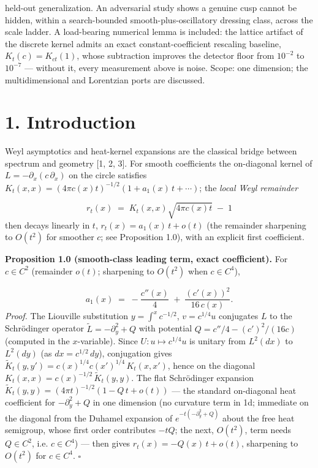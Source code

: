 \documentclass[11pt]{article}
\begin{document}
held-out generalization. An adversarial study shows a genuine cusp cannot be hidden, within a search-bounded smooth-plus-oscillatory dressing class, across the scale ladder.  A load-bearing numerical lemma is included: the lattice artifact of the discrete kernel admits an exact constant-coefficient rescaling baseline, $K_t(c) = K_{ct}(1)$, whose subtraction improves the detector floor from $10^{-2}$ to $10^{-7}$ — without it, every measurement above is noise.  Scope: one dimension; the multidimensional and Lorentzian ports are discussed.

\section*{1. Introduction}
Weyl asymptotics and heat-kernel expansions are the classical bridge between spectrum and geometry [1, 2, 3].  For smooth coefficients the on-diagonal kernel of $L = -\partial_x(c\,\partial_x)$ on the circle satisfies $K_t(x,x) = (4\pi c(x)t)^{-1/2}(1 + a_1(x)\,t + \cdots)$; the \emph{local Weyl remainder}

\[
r_t(x) \;=\; K_t(x,x)\sqrt{4\pi c(x)t} \;-\; 1
\]
then decays linearly in $t$, $r_t(x) = a_1(x)\,t + o(t)$ (the remainder sharpening to $O(t^2)$ for smoother $c$; see Proposition 1.0), with an explicit first coefficient.

\textbf{Proposition 1.0 (smooth-class leading term, exact coefficient).} For $c \in C^2$ (remainder $o(t)$; sharpening to $O(t^2)$ when $c \in C^4$),

\[
a_1(x) \;=\; -\frac{c''(x)}{4} \;+\; \frac{(c'(x))^2}{16\,c(x)} .
\]
\emph{Proof.}  The Liouville substitution $y = \int^x c^{-1/2}$, $v = c^{1/4}u$ conjugates $L$ to the Schrödinger operator $\tilde L = -\partial_y^2 + Q$ with potential $Q = c''/4 - (c')^2/(16c)$ (computed in the $x$-variable).  Since $U : u \mapsto c^{1/4}u$ is unitary from $L^2(dx)$ to $L^2(dy)$ (as $dx = c^{1/2}\,dy$), conjugation gives $\tilde K_t(y,y') = c(x)^{1/4}c(x')^{1/4}\,K_t(x,x')$, hence on the diagonal $K_t(x,x) = c(x)^{-1/2}\,\tilde K_t(y,y)$.  The flat Schrödinger expansion $\tilde K_t(y,y) = (4\pi t)^{-1/2}(1 - Q\,t + o(t))$ — the standard on-diagonal heat coefficient for $-\partial_y^2 + Q$ in one dimension (no curvature term in 1d; immediate on the diagonal from the Duhamel expansion of $e^{-t(-\partial_y^2 + Q)}$ about the free heat semigroup, whose first order contributes $-tQ$; the next, $O(t^2)$, term needs $Q \in C^2$, i.e. $c \in C^4$) — then gives $r_t(x) = -Q(x)\,t + o(t)$, sharpening to $O(t^2)$ for $c \in C^4$. $\square$
\end{document}
